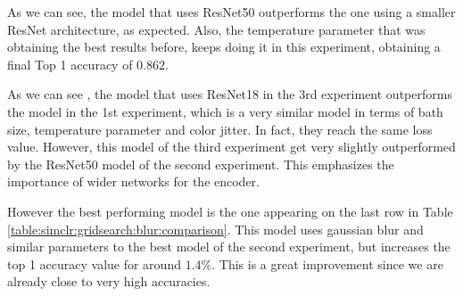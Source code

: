 As we can see, the model that uses ResNet50 outperforms the one using a smaller ResNet architecture, as expected. Also, the temperature parameter that was obtaining the best results before, keeps doing it in this experiment, obtaining a final Top 1 accuracy of $0.862$.




    \begin{table}[H]
        \caption{Comparison of the results of the third experiment with the best results of the two previous experiments.}
        \label{table:simclr:gridsearch:blur:comparison}
        \end{table}

As we can see , the model that uses ResNet18 in the 3rd experiment outperforms the model in the 1st experiment, which is a very similar model in terms of bath size, temperature parameter and color jitter. In fact, they reach the same loss value. However, this model of the third experiment get very slightly outperformed by the ResNet50 model of the second experiment. This emphasizes the importance of wider networks for the encoder. 

However the best performing model is the one appearing on the last row in Table \ref{table:simclr:gridsearch:blur:comparison}. This model uses gaussian blur and similar parameters to the best model of the second experiment, but increases the top 1 accuracy value for around $1.4\%$. This is a great improvement since we are already close to very high accuracies.  

